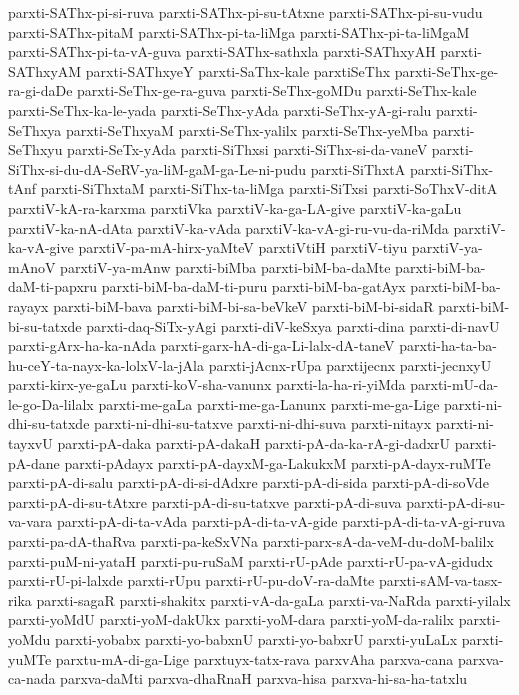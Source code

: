 {parxti-SAThx-pi-si-ruva
parxti-SAThx-pi-su-tAtxne
parxti-SAThx-pi-su-vudu
parxti-SAThx-pitaM
parxti-SAThx-pi-ta-liMga
parxti-SAThx-pi-ta-liMgaM
parxti-SAThx-pi-ta-vA-guva
parxti-SAThx-sathxla
parxti-SAThxyAH
parxti-SAThxyAM
parxti-SAThxyeY
parxti-SaThx-kale
parxtiSeThx
parxti-SeThx-ge-ra-gi-daDe
parxti-SeThx-ge-ra-guva
parxti-SeThx-goMDu
parxti-SeThx-kale
parxti-SeThx-ka-le-yada
parxti-SeThx-yAda
parxti-SeThx-yA-gi-ralu
parxti-SeThxya
parxti-SeThxyaM
parxti-SeThx-yalilx
parxti-SeThx-yeMba
parxti-SeThxyu
parxti-SeTx-yAda
parxti-SiThxsi
parxti-SiThx-si-da-vaneV
parxti-SiThx-si-du-dA-SeRV-ya-liM-gaM-ga-Le-ni-pudu
parxti-SiThxtA
parxti-SiThx-tAnf
parxti-SiThxtaM
parxti-SiThx-ta-liMga
parxti-SiTxsi
parxti-SoThxV-ditA
parxtiV-kA-ra-karxma
parxtiVka
parxtiV-ka-ga-LA-give
parxtiV-ka-gaLu
parxtiV-ka-nA-dAta
parxtiV-ka-vAda
parxtiV-ka-vA-gi-ru-vu-da-riMda
parxtiV-ka-vA-give
parxtiV-pa-mA-hirx-yaMteV
parxtiVtiH
parxtiV-tiyu
parxtiV-ya-mAnoV
parxtiV-ya-mAnw
parxti-biMba
parxti-biM-ba-daMte
parxti-biM-ba-daM-ti-papxru
parxti-biM-ba-daM-ti-puru
parxti-biM-ba-gatAyx
parxti-biM-ba-rayayx
parxti-biM-bava
parxti-biM-bi-sa-beVkeV
parxti-biM-bi-sidaR
parxti-biM-bi-su-tatxde
parxti-daq-SiTx-yAgi
parxti-diV-keSxya
parxti-dina
parxti-di-navU
parxti-gArx-ha-ka-nAda
parxti-garx-hA-di-ga-Li-lalx-dA-taneV
parxti-ha-ta-ba-hu-ceY-ta-nayx-ka-lolxV-la-jAla
parxti-jAcnx-rUpa
parxtijecnx
parxti-jecnxyU
parxti-kirx-ye-gaLu
parxti-koV-sha-vanunx
parxti-la-ha-ri-yiMda
parxti-mU-da-le-go-Da-lilalx
parxti-me-gaLa
parxti-me-ga-Lanunx
parxti-me-ga-Lige
parxti-ni-dhi-su-tatxde
parxti-ni-dhi-su-tatxve
parxti-ni-dhi-suva
parxti-nitayx
parxti-ni-tayxvU
parxti-pA-daka
parxti-pA-dakaH
parxti-pA-da-ka-rA-gi-dadxrU
parxti-pA-dane
parxti-pAdayx
parxti-pA-dayxM-ga-LakukxM
parxti-pA-dayx-ruMTe
parxti-pA-di-salu
parxti-pA-di-si-dAdxre
parxti-pA-di-sida
parxti-pA-di-soVde
parxti-pA-di-su-tAtxre
parxti-pA-di-su-tatxve
parxti-pA-di-suva
parxti-pA-di-su-va-vara
parxti-pA-di-ta-vAda
parxti-pA-di-ta-vA-gide
parxti-pA-di-ta-vA-gi-ruva
parxti-pa-dA-thaRva
parxti-pa-keSxVNa
parxti-parx-sA-da-veM-du-doM-balilx
parxti-puM-ni-yataH
parxti-pu-ruSaM
parxti-rU-pAde
parxti-rU-pa-vA-gidudx
parxti-rU-pi-lalxde
parxti-rUpu
parxti-rU-pu-doV-ra-daMte
parxti-sAM-va-tasx-rika
parxti-sagaR
parxti-shakitx
parxti-vA-da-gaLa
parxti-va-NaRda
parxti-yilalx
parxti-yoMdU
parxti-yoM-dakUkx
parxti-yoM-dara
parxti-yoM-da-ralilx
parxti-yoMdu
parxti-yobabx
parxti-yo-babxnU
parxti-yo-babxrU
parxti-yuLaLx
parxti-yuMTe
parxtu-mA-di-ga-Lige
parxtuyx-tatx-rava
parxvAha
parxva-cana
parxva-ca-nada
parxva-daMti
parxva-dhaRnaH
parxva-hisa
parxva-hi-sa-ha-tatxlu
}
